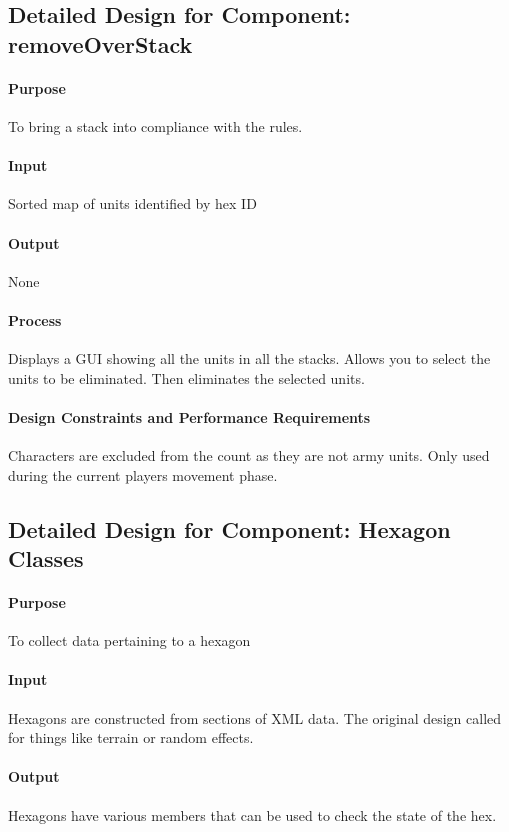 \documentclass[12pt,a4paper,titlepage]{article}
\begin{document}
\subsection{Detailed Design for Component: removeOverStack}
\paragraph{Purpose} To bring a stack into compliance with the rules.
\paragraph{Input} Sorted map of units identified by hex ID
\paragraph{Output} None
\paragraph{Process} Displays a GUI showing all the units in all the stacks. Allows you to select the units to be eliminated. Then eliminates the selected units.
\paragraph{Design Constraints and Performance Requirements} Characters are excluded from the count as they are not army units.  Only used during the current players movement phase.  

\subsection{Detailed Design for Component: Hexagon Classes}
\paragraph{Purpose} To collect data pertaining to a hexagon
\paragraph{Input}
Hexagons are constructed from sections of XML data.
The original design called for things like terrain or random effects.
\paragraph{Output}
Hexagons have various members that can be used to check the state of the hex.
\end{document}
